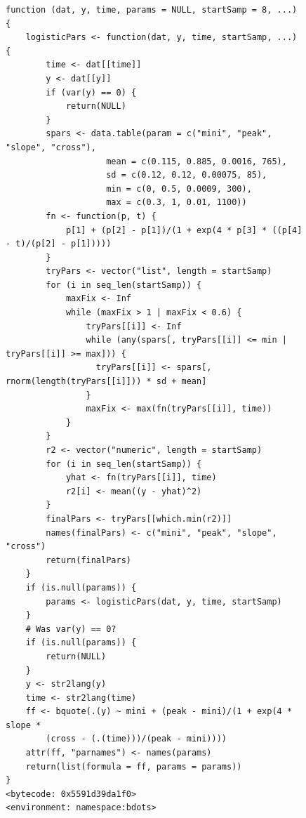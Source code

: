 \documentclass{article}
\begin{document}
\begin{singlespace}
\begin{figure}[H]
\centering
\begin{BVerbatim}
function (dat, y, time, params = NULL, startSamp = 8, ...) {
    logisticPars <- function(dat, y, time, startSamp, ...) {
        time <- dat[[time]]
        y <- dat[[y]]
        if (var(y) == 0) {
            return(NULL)
        }
        spars <- data.table(param = c("mini", "peak", "slope", "cross"), 
                    mean = c(0.115, 0.885, 0.0016, 765), 
                    sd = c(0.12, 0.12, 0.00075, 85), 
                    min = c(0, 0.5, 0.0009, 300), 
                    max = c(0.3, 1, 0.01, 1100))
        fn <- function(p, t) {
            p[1] + (p[2] - p[1])/(1 + exp(4 * p[3] * ((p[4] - t)/(p[2] - p[1]))))
        }
        tryPars <- vector("list", length = startSamp)
        for (i in seq_len(startSamp)) {
            maxFix <- Inf
            while (maxFix > 1 | maxFix < 0.6) {
                tryPars[[i]] <- Inf
                while (any(spars[, tryPars[[i]] <= min | tryPars[[i]] >= max])) {
                  tryPars[[i]] <- spars[, rnorm(length(tryPars[[i]])) * sd + mean]
                }
                maxFix <- max(fn(tryPars[[i]], time))
            }
        }
        r2 <- vector("numeric", length = startSamp)
        for (i in seq_len(startSamp)) {
            yhat <- fn(tryPars[[i]], time)
            r2[i] <- mean((y - yhat)^2)
        }
        finalPars <- tryPars[[which.min(r2)]]
        names(finalPars) <- c("mini", "peak", "slope", "cross")
        return(finalPars)
    }
    if (is.null(params)) {
        params <- logisticPars(dat, y, time, startSamp)
    }
    # Was var(y) == 0?
    if (is.null(params)) {
        return(NULL)
    }
    y <- str2lang(y)
    time <- str2lang(time)
    ff <- bquote(.(y) ~ mini + (peak - mini)/(1 + exp(4 * slope * 
        (cross - (.(time)))/(peak - mini))))
    attr(ff, "parnames") <- names(params)
    return(list(formula = ff, params = params))
}
<bytecode: 0x5591d39da1f0>
<environment: namespace:bdots>
\end{BVerbatim}
\end{figure}
\end{singlespace}
\end{document}
